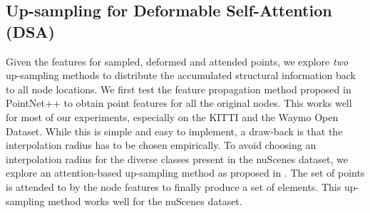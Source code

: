 \documentclass[10pt,twocolumn,letterpaper]{article}
\begin{document}
\subsection{Up-sampling for Deformable Self-Attention (DSA)}
Given the features for  sampled, deformed and attended points, we explore \textit{two} up-sampling methods to distribute the accumulated structural information back to all  node locations. We first test the feature propagation method proposed in PointNet++ \cite{pointnetplusplus} to obtain point features for all the original nodes. This works well for most of our experiments, especially on the KITTI and the Waymo Open Dataset. While this is simple and easy to implement, a draw-back is that the interpolation radius has to be chosen empirically. To avoid choosing an interpolation radius for the diverse classes present in the nuScenes dataset, we explore an attention-based up-sampling method as proposed in \cite{SetTransformer}. The set of  points is attended to by the  node features to finally produce a set of  elements. This up-sampling method works well for the nuScenes dataset.
\setlength{\tabcolsep}{15pt}
\end{document}
